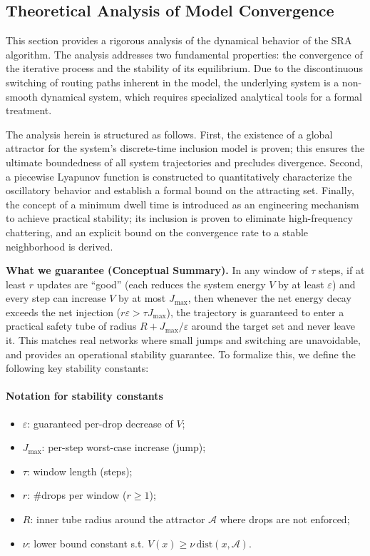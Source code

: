\documentclass[journal]{IEEEtran}
\begin{document}
\subsection{Theoretical Analysis of Model Convergence}
\label{sec:convergence_analysis}

This section provides a rigorous analysis of the dynamical behavior of the SRA algorithm. The analysis addresses two fundamental properties: the convergence of the iterative process and the stability of its equilibrium. Due to the discontinuous switching of routing paths inherent in the model, the underlying system is a non-smooth dynamical system, which requires specialized analytical tools for a formal treatment.

The analysis herein is structured as follows. First, the existence of a global attractor for the system's discrete-time inclusion model is proven; this ensures the ultimate boundedness of all system trajectories and precludes divergence. Second, a piecewise Lyapunov function is constructed to quantitatively characterize the oscillatory behavior and establish a formal bound on the attracting set. Finally, the concept of a minimum dwell time is introduced as an engineering mechanism to achieve practical stability; its inclusion is proven to eliminate high-frequency chattering, and an explicit bound on the convergence rate to a stable neighborhood is derived.

\textbf{What we guarantee (Conceptual Summary).} 
In any window of $\tau$ steps, if at least $r$ updates are ``good'' (each reduces the system energy $V$ by at least $\varepsilon$) and every step can increase $V$ by at most $J_{\max}$, then whenever the net energy decay exceeds the net injection ($r\varepsilon > \tau J_{\max}$), the trajectory is guaranteed to enter a practical safety tube of radius $R+J_{\max}/\varepsilon$ around the target set and never leave it. This matches real networks where small jumps and switching are unavoidable, and provides an operational stability guarantee. To formalize this, we define the following key stability constants:

\paragraph*{Notation for stability constants}
\begin{itemize}
    \itemsep0em
    \item $\varepsilon$: guaranteed per-drop decrease of $V$;
    \item $J_{\max}$: per-step worst-case increase (jump);
    \item $\tau$: window length (steps);
    \item $r$: \#drops per window ($r\ge 1$);
    \item $R$: inner tube radius around the attractor $\mathcal{A}$ where drops are not enforced;
    \item $\nu$: lower bound constant s.t. $V(x)\ge \nu\,\mathrm{dist}(x,\mathcal{A})$.
\end{itemize}
\end{document}
